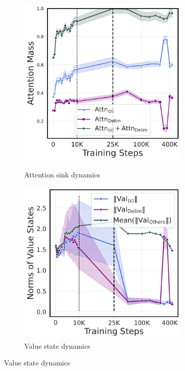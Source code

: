 \begin{figure}[t]
    \centering
    \begin{subfigure}[t]{0.32\textwidth}
        \centering 
        \caption{\small Attention sink dynamics}
        \includegraphics[width=0.9\textwidth]{Figures/olmo/attn_mass_on_top_two_tokens.pdf}
        \label{fig:olmo_sink}
    \end{subfigure}
    \begin{subfigure}[t]{0.32\textwidth}
        \centering 
        \caption{\small Value state dynamics}
        \includegraphics[width=0.9\textwidth]{Figures/olmo/value_norms.pdf}

\end{subfigure}
\end{figure}
